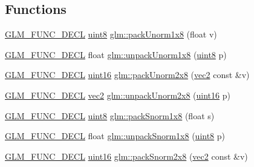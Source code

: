 \subsection*{Functions}
\begin{DoxyCompactItemize}
\item 
\hyperlink{setup_8hpp_ab2d052de21a70539923e9bcbf6e83a51}{G\+L\+M\+\_\+\+F\+U\+N\+C\+\_\+\+D\+E\+CL} \hyperlink{group__gtc__type__precision_ga1a7dcd8aac97cc8020817c94049deff2}{uint8} \hyperlink{group__gtc__packing_ga2f9963e5d762b10085b280d3662017ba}{glm\+::pack\+Unorm1x8} (float v)
\item 
\hyperlink{setup_8hpp_ab2d052de21a70539923e9bcbf6e83a51}{G\+L\+M\+\_\+\+F\+U\+N\+C\+\_\+\+D\+E\+CL} float \hyperlink{group__gtc__packing_ga32f3f2642df2ea87449d59fb614a8305}{glm\+::unpack\+Unorm1x8} (\hyperlink{group__gtc__type__precision_ga1a7dcd8aac97cc8020817c94049deff2}{uint8} p)
\item 
\hyperlink{setup_8hpp_ab2d052de21a70539923e9bcbf6e83a51}{G\+L\+M\+\_\+\+F\+U\+N\+C\+\_\+\+D\+E\+CL} \hyperlink{group__gtc__type__precision_gad8c2939e1fdd8e5828b31d95c52255d5}{uint16} \hyperlink{group__gtc__packing_ga833288fc0d4a79f19d0db75a6843bfe6}{glm\+::pack\+Unorm2x8} (\hyperlink{group__core__types_gaa1618f51db67eaa145db101d8c8431d8}{vec2} const \&v)
\item 
\hyperlink{setup_8hpp_ab2d052de21a70539923e9bcbf6e83a51}{G\+L\+M\+\_\+\+F\+U\+N\+C\+\_\+\+D\+E\+CL} \hyperlink{group__core__types_gaa1618f51db67eaa145db101d8c8431d8}{vec2} \hyperlink{group__gtc__packing_ga96ce0c24339ee676e28a027fffd1edf6}{glm\+::unpack\+Unorm2x8} (\hyperlink{group__gtc__type__precision_gad8c2939e1fdd8e5828b31d95c52255d5}{uint16} p)
\item 
\hyperlink{setup_8hpp_ab2d052de21a70539923e9bcbf6e83a51}{G\+L\+M\+\_\+\+F\+U\+N\+C\+\_\+\+D\+E\+CL} \hyperlink{group__gtc__type__precision_ga1a7dcd8aac97cc8020817c94049deff2}{uint8} \hyperlink{group__gtc__packing_ga26b6cd7a35c46c4b6a342f3b97b47423}{glm\+::pack\+Snorm1x8} (float s)
\item 
\hyperlink{setup_8hpp_ab2d052de21a70539923e9bcbf6e83a51}{G\+L\+M\+\_\+\+F\+U\+N\+C\+\_\+\+D\+E\+CL} float \hyperlink{group__gtc__packing_ga6f2bebf536fbf7c8b97d4b306bb3354e}{glm\+::unpack\+Snorm1x8} (\hyperlink{group__gtc__type__precision_ga1a7dcd8aac97cc8020817c94049deff2}{uint8} p)
\item 
\hyperlink{setup_8hpp_ab2d052de21a70539923e9bcbf6e83a51}{G\+L\+M\+\_\+\+F\+U\+N\+C\+\_\+\+D\+E\+CL} \hyperlink{group__gtc__type__precision_gad8c2939e1fdd8e5828b31d95c52255d5}{uint16} \hyperlink{group__gtc__packing_ga05d08a82923166ec7cd5d0e6154c9953}{glm\+::pack\+Snorm2x8} (\hyperlink{group__core__types_gaa1618f51db67eaa145db101d8c8431d8}{vec2} const \&v)

\end{DoxyCompactItemize}
